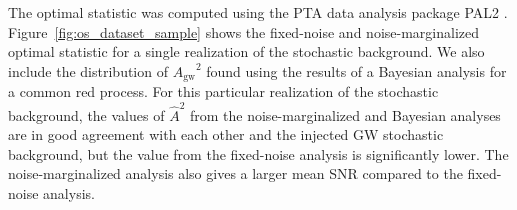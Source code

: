 \documentclass[twocolumn,aps,prd,superscriptaddress]{revtex4-1}
\newcommand{\Agw}{\ensuremath{A_\mathrm{gw}}}
\begin{document}
The optimal statistic was computed using the PTA data analysis package 
PAL2 %
\citep{evh17a}. 
Figure~\ref{fig:os_dataset_sample} shows the fixed-noise and noise-marginalized 
optimal statistic for a single realization of the stochastic background. 
We also include the distribution of $\Agw^2$ found using the results of a Bayesian analysis 
for a common red process. For this particular realization of the stochastic background, 
the values of $\hat{A}^2$ from the noise-marginalized and Bayesian analyses are in good agreement 
with each other and the injected GW stochastic background, 
but the value from the fixed-noise analysis is significantly lower. 
The noise-marginalized analysis also gives a larger mean SNR compared to the fixed-noise analysis.
\end{document}
